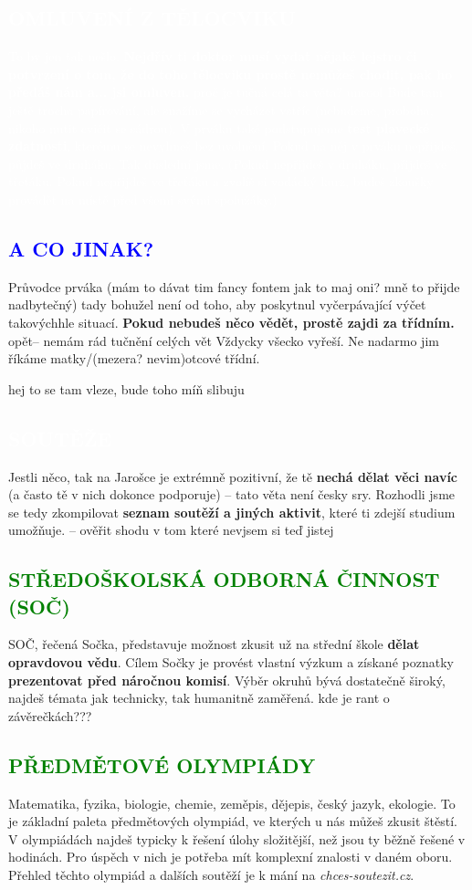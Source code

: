 \documentclass{article}
\newcommand{\nadpiss}[1]{
\vspace*{-60pt}
  \begin{nadpisboxs}
    \vspace*{20pt}
    \centering \section*{\textcolor{white}{#1}}
  \end{nadpisboxs}
}
\newcommand{\podnadpisf}[1]{
  \subsection*{\textcolor{blue}{#1}}
}
\newcommand{\podnadpiss}[1]{
  \subsection*{\textcolor{green}{#1}}
}
\begin{document}
\begin{bluebox}
  \textcolor{white}{\subsection*{OMLUVENÍ Z TĚLOCVIKU}
  To by jen tak nešlo. \textbf{Nejdřív ti doktor musí vydat nějaké lejstro či potvrzení o tom, že do toho tělocviku prostě nemůžeš chodit, pak ho předáš nám a... jsi omluven.} proč je tučná celá ta věta? uncool Bude tam ještě trocha papírování, ale snažíme se vycházet vstříc (nebudeme, proboha, nikoho nutit cvičit se sádrou). V prváku také podstupujeme \textbf{test plavecké zdatnosti}, kterému se nevyhneš bez uvolnění. Pokud na něj v prváku nepřijdeš, půjdeš ve druháku. Tak důslední jsme. (Pokud nepřijdeš v druháku, přijdeš ve třeťáku. Pokud nepřijdeš ve třeťáku a zvolíš si vodácký kurz, budeš zkoušky provádět na místě před všemi svými spolužáky.)
  }
\end{bluebox}

\podnadpisf{A CO JINAK?}
Průvodce prváka (mám to dávat tim fancy fontem jak to maj oni? mně to přijde nadbytečný) tady bohužel není od toho, aby poskytnul vyčerpávající výčet takovýchhle situací. \textbf{Pokud nebudeš něco vědět, prostě zajdi za třídním.} opět-- nemám rád tučnění celých vět Vždycky všecko vyřeší. Ne nadarmo jim říkáme matky/(mezera? nevim)otcové třídní.

hej to se tam vleze, bude toho míň slibuju
\pagebreak
\nadpiss{SOUTĚŽE}
\noindent Jestli něco, tak na Jarošce je extrémně pozitivní, že tě \textbf{nechá dělat věci navíc} (a často tě v nich dokonce podporuje) -- tato věta není česky sry. Rozhodli jsme se tedy zkompilovat \textbf{seznam soutěží a jiných aktivit}, které ti zdejší studium umožňuje. -- ověřit shodu v tom které nevjsem si teď jistej

\podnadpiss{STŘEDOŠKOLSKÁ ODBORNÁ ČINNOST (SOČ)}
SOČ, řečená Sočka, představuje možnost zkusit už na střední škole \textbf{dělat opravdovou vědu}. Cílem Sočky je provést vlastní výzkum a získané poznatky \textbf{prezentovat před náročnou komisí}. Výběr okruhů bývá dostatečně široký, najdeš témata jak technicky, tak humanitně zaměřená. kde je rant o závěrečkách???

\podnadpiss{PŘEDMĚTOVÉ OLYMPIÁDY}
Matematika, fyzika, biologie, chemie, zeměpis, dějepis, český jazyk, ekologie. To je základní paleta předmětových olympiád, ve kterých u nás můžeš zkusit štěstí. V olympiádách najdeš typicky k řešení úlohy složitější, než jsou ty běžně řešené v hodinách. Pro úspěch v nich je potřeba mít komplexní znalosti v daném oboru. Přehled těchto olympiád a dalších soutěží je k mání na \textit{chces-soutezit.cz}.
\end{document}
